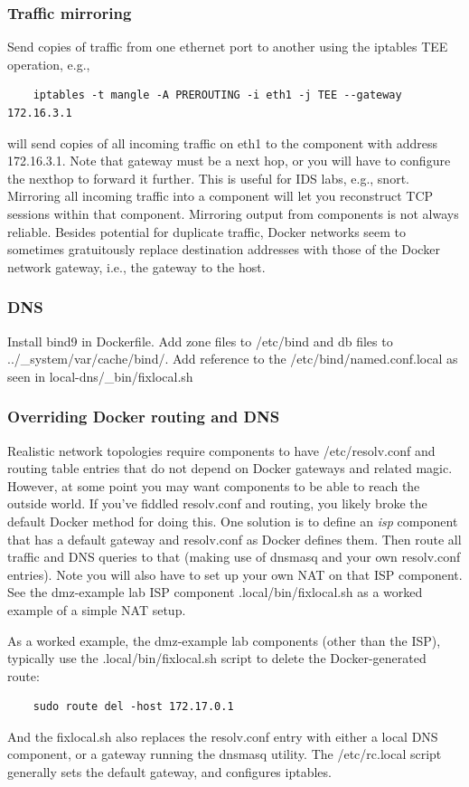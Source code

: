 \documentclass[12pt]{article}
\begin{document}
\subsubsection{Traffic mirroring}
Send copies of traffic from one ethernet port to another using the iptables TEE operation, e.g.,
\begin{verbatim}
    iptables -t mangle -A PREROUTING -i eth1 -j TEE --gateway 172.16.3.1
\end{verbatim}
\noindent will send copies of all incoming traffic on eth1 to the component with address 172.16.3.1.
Note that gateway must be a next hop, or you will have to configure the nexthop to forward it further.
This is useful for IDS labs, e.g., snort.  Mirroring all incoming traffic into a component will let you
reconstruct TCP sessions within that component.  Mirroring output from components is not always reliable.
Besides potential for duplicate traffic, Docker networks seem to sometimes gratuitously replace destination
addresses with those of the Docker network gateway, i.e., the gateway to the host.

\subsubsection{DNS}
Install bind9 in Dockerfile.  Add zone files to /etc/bind and db files to ../\_system/var/cache/bind/.
Add reference to the /etc/bind/named.conf.local as seen in local-dns/\_bin/fixlocal.sh

\subsubsection{Overriding Docker routing and DNS}
Realistic network topologies require components to have /etc/resolv.conf and routing
table entries that do not depend on Docker gateways and related magic.  However, at some point you may
want components to be able to reach the outside world.  If you've fiddled resolv.conf and routing,
you likely broke the default Docker method for doing this.  One solution is to 
define an \textit{isp} component that has a default gateway and resolv.conf as Docker defines them.  Then
route all traffic and DNS queries to that (making use of dnsmasq and your own resolv.conf entries).  
Note you will also have to set up your own NAT on that ISP component.  See the dmz-example lab
ISP component .local/bin/fixlocal.sh as a worked example of a simple NAT setup.

As a worked example, the dmz-example lab components (other than the ISP), typically use the .local/bin/fixlocal.sh script to 
delete the Docker-generated route:
\begin{verbatim}
    sudo route del -host 172.17.0.1
\end{verbatim}
\noindent And the fixlocal.sh also replaces the resolv.conf entry with either a local DNS component, or a gateway running
the dnsmasq utility.  The /etc/rc.local script generally sets the default gateway, and configures iptables.
\end{document}
